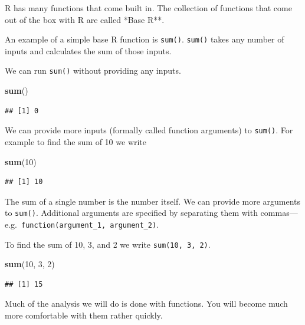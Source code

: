 \documentclass[
]{book}
\newenvironment{Shaded}{\begin{snugshade}}{\end{snugshade}}
\newcommand{\DecValTok}[1]{\textcolor[rgb]{0.00,0.00,0.81}{#1}}
\newcommand{\KeywordTok}[1]{\textcolor[rgb]{0.13,0.29,0.53}{\textbf{#1}}}
\newcommand{\NormalTok}[1]{#1}
\begin{document}
R has many functions that come built in. The collection of functions that come out of the box with R are called *Base R**.

An example of a simple base R function is \texttt{sum()}. \texttt{sum()} takes any number of inputs and calculates the sum of those inputs.

We can run \texttt{sum()} without providing any inputs.

\begin{Shaded}
\begin{Highlighting}[]
\KeywordTok{sum}\NormalTok{()}
\end{Highlighting}
\end{Shaded}

\begin{verbatim}
## [1] 0
\end{verbatim}

We can provide more inputs (formally called function arguments) to \texttt{sum()}. For example to find the sum of 10 we write

\begin{Shaded}
\begin{Highlighting}[]
\KeywordTok{sum}\NormalTok{(}\DecValTok{10}\NormalTok{)}
\end{Highlighting}
\end{Shaded}

\begin{verbatim}
## [1] 10
\end{verbatim}

The sum of a single number is the number itself. We can provide more arguments to \texttt{sum()}. Additional arguments are specified by separating them with commas---e.g.~\texttt{function(argument\_1,\ argument\_2)}.

To find the sum of 10, 3, and 2 we write \texttt{sum(10,\ 3,\ 2)}.

\begin{Shaded}
\begin{Highlighting}[]
\KeywordTok{sum}\NormalTok{(}\DecValTok{10}\NormalTok{, }\DecValTok{3}\NormalTok{, }\DecValTok{2}\NormalTok{)}
\end{Highlighting}
\end{Shaded}

\begin{verbatim}
## [1] 15
\end{verbatim}

Much of the analysis we will do is done with functions. You will become much more comfortable with them rather quickly.
\end{document}
